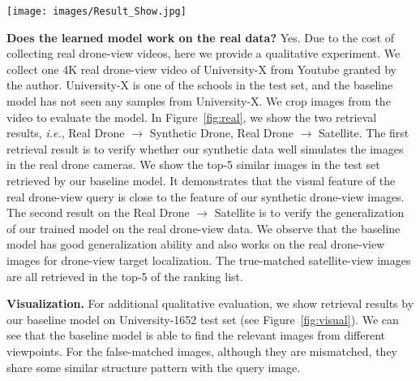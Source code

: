\documentclass[sigconf]{acmart}
\def\ie{\emph{i.e.}}
\begin{document}
\begin{figure*}[t]
\begin{center}
     \texttt{[image: images/Result\_Show.jpg]}
\end{center}
\vspace{-.2in}
      \caption{ Qualitative image search results using real drone-view query. We evaluate the baseline model on an unseen university. There are two results: (I) In the middle column, we use the real drone-view query to search similar synthetic drone-view images. The result suggests that the synthetic data in University-1652 is close to the real drone-view images; (II) In the right column, we show the retrieval results on satellite-view images. It verifies that the baseline model trained on University-1652 has good generalization ability and works well on the real-world query.
      }\label{fig:real}
\end{figure*}

\noindent\textbf{Does the learned model work on the real data?} Yes. Due to the cost of collecting real drone-view videos, here we provide a qualitative experiment. We collect one 4K real drone-view video of University-X from Youtube granted by the author. University-X is one of the schools in the test set, and the baseline model has not seen any samples from University-X. We crop images from the video to evaluate the model. In Figure~\ref{fig:real}, we show the two retrieval results, \ie, Real Drone $\rightarrow$ Synthetic Drone, Real Drone $\rightarrow$ Satellite. The first retrieval result is to verify whether our synthetic data well simulates the images in the real drone cameras. We show the top-5 similar images in the test set retrieved by our baseline model. It demonstrates that the visual feature of the real drone-view query is close to the feature of our synthetic drone-view images.
The second result on the Real Drone $\rightarrow$ Satellite is to verify the generalization of our trained model on the real drone-view data. We observe that the baseline model has good generalization ability and also works on the real drone-view images for drone-view target localization. The true-matched satellite-view images are all retrieved in the top-5 of the ranking list.



\noindent\textbf{Visualization.} For additional qualitative evaluation, we show retrieval results by our baseline model on University-1652 test set (see Figure~\ref{fig:visual}). We can see that the baseline model is able to find the relevant images from different viewpoints. For the false-matched images, although they are mismatched, they share some similar structure pattern with the query image.
\end{document}
